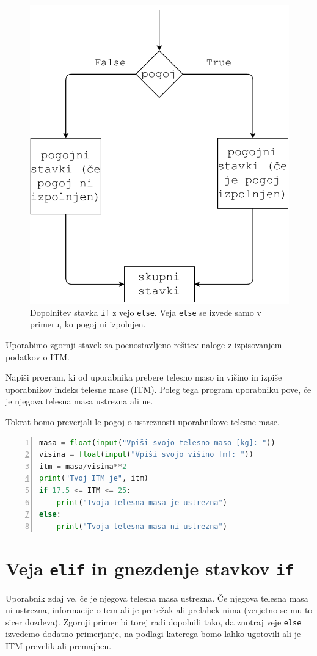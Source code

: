 \begin{figure}
    \centering
    \includegraphics[width=0.5\linewidth]{img/if2.pdf}
    \caption{Dopolnitev stavka \texttt{if} z vejo \texttt{else}. Veja \texttt{else} se izvede samo v primeru, ko pogoj ni izpolnjen.}
    \label{img:if2}
\end{figure}

Uporabimo zgornji stavek za poenostavljeno rešitev naloge z izpisovanjem podatkov o ITM.
\begin{zgled}
Napiši program, ki od uporabnika prebere telesno maso in višino in izpiše uporabnikov indeks telesne mase (ITM). Poleg tega program uporabniku pove, če je njegova telesna masa ustrezna ali ne. 
\end{zgled}
\begin{resitev}
Tokrat bomo preverjali le pogoj o ustreznosti uporabnikove telesne mase. 
\begin{lstlisting}[language=Python,numbers=left]
masa = float(input("Vpiši svojo telesno maso [kg]: "))
visina = float(input("Vpiši svojo višino [m]: "))
itm = masa/visina**2
print("Tvoj ITM je", itm)
if 17.5 <= ITM <= 25:
    print("Tvoja telesna masa je ustrezna")
else:
    print("Tvoja telesna masa ni ustrezna")
\end{lstlisting}
\end{resitev}

\section{Veja \texttt{elif} in gnezdenje stavkov \texttt{if}}

Uporabnik zdaj ve, če je njegova telesna masa ustrezna. Če njegova telesna masa ni ustrezna, informacije o tem ali je pretežak ali prelahek nima (verjetno se mu to sicer dozdeva). Zgornji primer bi torej radi dopolnili tako, da znotraj veje \texttt{else} izvedemo dodatno primerjanje, na podlagi katerega bomo lahko ugotovili ali je ITM prevelik ali premajhen.

